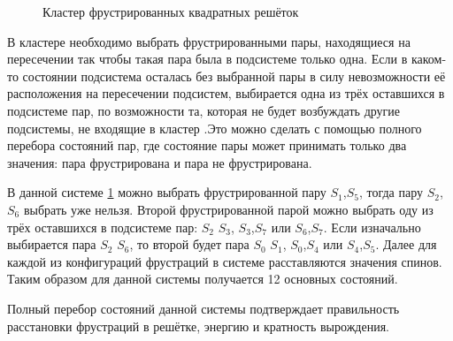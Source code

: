 \documentclass[utf8, babel, sor, jor, amsmath,amssymb, reprint]{elsarticle} %
\begin{document}
\begin{figure}[h]
	\centering
	\caption{Кластер фрустрированных квадратных решёток}
	\label{fig:cluster}
\end{figure}

В кластере необходимо выбрать фрустрированными пары, находящиеся на пересечении так чтобы такая пара была в подсистеме только одна. Если в каком-то состоянии подсистема осталась без выбранной пары в силу невозможности её расположения на пересечении подсистем, выбирается одна из трёх оставшихся в подсистеме пар, по возможности та, которая не будет возбуждать другие подсистемы, не входящие в кластер .Это можно сделать с помощью полного перебора состояний пар, где состояние пары может принимать только два значения: пара фрустрирована и пара не фрустрирована.

В данной системе \ref{fig:cluster} можно выбрать фрустрированной пару $S_1$,$S_5$, тогда пару  $S_2$,$S_6$ выбрать уже нельзя. Второй фрустрированной парой можно выбрать оду из трёх оставшихся в подсистеме пар: $S_2$ $S_3$, $S_3$,$S_7$ или $S_6$,$S_7$. Если изначально выбирается пара $S_2$ $S_6$, то второй будет пара $S_0$ $S_1$, $S_0$,$S_4$ или $S_4$,$S_5$. Далее для каждой из конфигураций фрустраций в системе расставляются значения спинов. Таким образом для данной системы получается 12 основных состояний.

Полный перебор состояний данной системы подтверждает правильность расстановки фрустраций в решётке, энергию и кратность вырождения.
\end{document}
